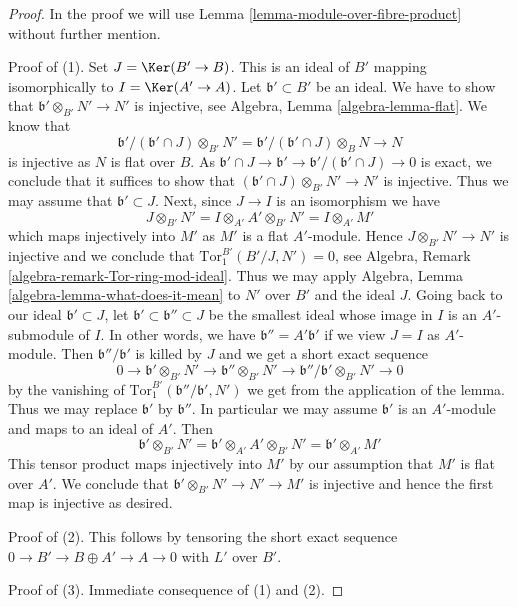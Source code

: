 \begin{proof}
In the proof we will use Lemma \ref{lemma-module-over-fibre-product}
without further mention.

\medskip\noindent
Proof of (1). Set $J = \Ker(B' \to B)$. This is an ideal of $B'$
mapping isomorphically to $I = \Ker(A' \to A)$.
Let $\mathfrak b' \subset B'$ be an ideal.
We have to show that $\mathfrak b' \otimes_{B'} N' \to N'$
is injective, see Algebra, Lemma \ref{algebra-lemma-flat}.
We know that
$$
\mathfrak b'/(\mathfrak b' \cap J) \otimes_{B'} N' =
\mathfrak b'/(\mathfrak b' \cap J) \otimes_B N \to N
$$
is injective as $N$ is flat over $B$. As
$\mathfrak b' \cap J \to \mathfrak b' \to
\mathfrak b'/(\mathfrak b' \cap J) \to 0$ is exact, we
conclude that it suffices to show that
$(\mathfrak b' \cap J) \otimes_{B'} N' \to N'$
is injective. Thus we may assume that $\mathfrak b' \subset J$.
Next, since $J \to I$ is an isomorphism we have
$$
J \otimes_{B'} N' =
I \otimes_{A'} A' \otimes_{B'} N' =
I \otimes_{A'} M'
$$
which maps injectively into $M'$ as $M'$ is a flat $A'$-module.
Hence $J \otimes_{B'} N' \to N'$ is injective and we conclude
that $\text{Tor}_1^{B'}(B'/J, N') = 0$, see
Algebra, Remark \ref{algebra-remark-Tor-ring-mod-ideal}.
Thus we may apply Algebra, Lemma \ref{algebra-lemma-what-does-it-mean}
to $N'$ over $B'$ and the ideal $J$.
Going back to our ideal $\mathfrak b' \subset J$, let
$\mathfrak b' \subset \mathfrak b'' \subset J$ be the smallest ideal
whose image in $I$ is an $A'$-submodule of $I$. In other words,
we have $\mathfrak b'' = A' \mathfrak b'$ if we view $J = I$
as $A'$-module. Then $\mathfrak b''/\mathfrak b'$ is killed
by $J$ and we get a short exact sequence
$$
0 \to \mathfrak b' \otimes_{B'} N' \to
\mathfrak b'' \otimes_{B'} N' \to
\mathfrak b''/\mathfrak b' \otimes_{B'} N' \to 0
$$
by the vanishing of $\text{Tor}_1^{B'}(\mathfrak b''/\mathfrak b', N')$
we get from the application of the lemma.
Thus we may replace $\mathfrak b'$ by $\mathfrak b''$.
In particular we may assume $\mathfrak b'$ is an $A'$-module
and maps to an ideal of $A'$. Then
$$
\mathfrak b' \otimes_{B'} N' =
\mathfrak b' \otimes_{A'} A' \otimes_{B'} N' =
\mathfrak b' \otimes_{A'} M'
$$
This tensor product maps injectively into $M'$ by our assumption that
$M'$ is flat over $A'$. We conclude that
$\mathfrak b' \otimes_{B'} N' \to N' \to M'$ is injective
and hence the first map is injective as desired.

\medskip\noindent
Proof of (2). This follows by tensoring the short exact sequence
$0 \to B' \to B \oplus A' \to A \to 0$ with $L'$ over $B'$.

\medskip\noindent
Proof of (3). Immediate consequence of (1) and (2).
\end{proof}

